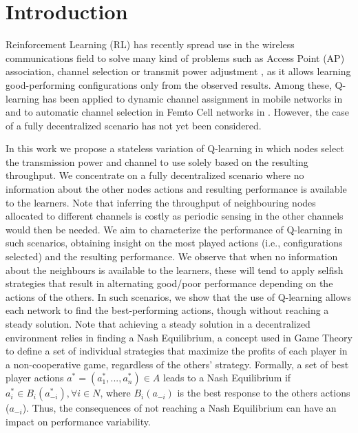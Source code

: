\documentclass[conference]{IEEEtran}
\begin{document}
	\IEEEpeerreviewmaketitle
	
	\section{Introduction}
	Reinforcement Learning (RL) has recently spread use in the wireless communications field to solve many kind of problems such as Access Point (AP) association, channel selection or transmit power adjustment \cite{nie1999qlearning, maghsudi2015joint}, as it allows learning good-performing configurations only from the observed results. Among these, Q-learning has been applied to dynamic channel assignment in mobile networks in \cite{nie1999qlearning} and to automatic channel selection in Femto Cell networks in \cite{bennis2010q}. However, the case of a fully decentralized scenario has not yet been considered.  
	
	In this work we propose a stateless variation of Q-learning in which nodes select the transmission power and channel to use solely based on the resulting throughput. We concentrate on a fully decentralized scenario where no information about the other nodes actions and resulting performance is available to the learners. Note that inferring the throughput of neighbouring nodes allocated to different channels is costly as periodic sensing in the other channels would then be needed. We aim to characterize the performance of Q-learning in such scenarios, obtaining insight on the most played actions (i.e., configurations selected) and the resulting performance. We observe that when no information about the neighbours is available to the learners, these will tend to apply selfish strategies that result in alternating good/poor performance depending on the actions of the others. In such scenarios, we show that the use of Q-learning allows each network to find the best-performing actions, though without reaching a steady solution. Note that achieving a steady solution in a decentralized environment relies in finding a Nash Equilibrium, a concept used in Game Theory to define a set of individual strategies that maximize the profits of each player in a non-cooperative game, regardless of the others' strategy. Formally, a set of best player actions $a^* = (a_1^*, ..., a_n^*) \in A$ leads to a Nash Equilibrium if $a_i^* \in B_i(a_{-i}^*), \forall i \in N$, where $B_i(a_{-i})$ is the best response to the others actions ($a_{-i}$). Thus, the consequences of not reaching a Nash Equilibrium can have an impact on performance variability.
	
\end{document}
